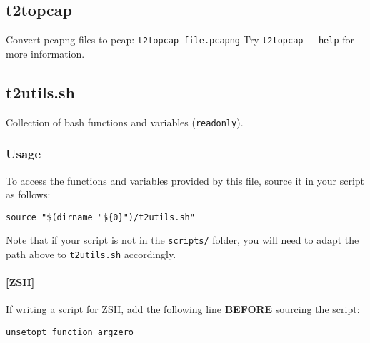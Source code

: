\documentclass[documentation]{subfiles}
\begin{document}

\subsection{t2topcap}\label{t2topcap}
Convert pcapng files to pcap: {\tt t2topcap file.pcapng}
\noindent Try {\tt t2topcap --{}--help} for more information.

\subsection{t2utils.sh}\label{t2utils.sh}
Collection of bash functions and variables ({\tt readonly}).

\subsubsection{Usage}
To access the functions and variables provided by this file, source it in your script as follows:
\begin{center}{\tt source "\$(dirname "\$\{0\}")/t2utils.sh"}\end{center}
Note that if your script is not in the {\tt scripts/} folder, you will need to adapt the path above to {\tt t2utils.sh} accordingly.

\paragraph{[ZSH]} If writing a script for ZSH, add the following line {\bf BEFORE} sourcing the script:
\begin{center}{\tt unsetopt function\_argzero}\end{center}

\clearpage
\end{document}
